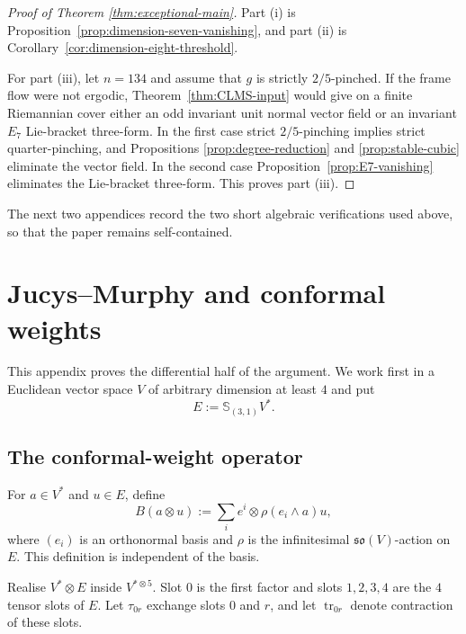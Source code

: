 \documentclass[reqno,11pt]{amsart}
\theoremstyle{definition}
\newcommand{\Hook}{\mathbb S_{(3,1)}}
\begin{document}
\begin{proof}[Proof of Theorem \ref{thm:exceptional-main}]
Part \textup{(i)} is Proposition~\ref{prop:dimension-seven-vanishing}, and
part \textup{(ii)} is Corollary~\ref{cor:dimension-eight-threshold}.

For part \textup{(iii)}, let $n=134$ and assume that $g$ is strictly
$2/5$-pinched.  If the frame flow were not ergodic,
Theorem~\ref{thm:CLMS-input} would give on a finite Riemannian cover either
an odd invariant unit normal vector field or an invariant $E_7$
Lie-bracket three-form.  In the first case strict $2/5$-pinching implies
strict quarter-pinching, and Propositions \ref{prop:degree-reduction} and
\ref{prop:stable-cubic} eliminate the vector field.  In the second case
Proposition~\ref{prop:E7-vanishing} eliminates the Lie-bracket three-form.
This proves part \textup{(iii)}.
\end{proof}



\appendix

The next two appendices record the two short algebraic verifications used above, so
that the paper remains self-contained.

\section{Jucys--Murphy and conformal weights}\label{sec:weitzenbock}\label{app:JM}

This appendix proves the differential half of the argument. We work first in a
Euclidean vector space $V$ of arbitrary dimension at least $4$ and put
$$
  E:=\Hook V^*.
$$



\subsection{The conformal-weight operator}

For $a\in V^*$ and $u\in E$, define
\begin{equation*}
  B(a\otimes u)
  :=\sum_i e^i\otimes\rho(e_i\wedge a)u,
\end{equation*}
where $(e_i)$ is an orthonormal basis and $\rho$ is the infinitesimal
$\mathfrak{so}(V)$-action on $E$. This definition is independent of the basis.

Realise $V^*\otimes E$ inside $V^{*\otimes5}$. Slot $0$ is the first factor and
slots $1,2,3,4$ are the $4$ tensor slots of $E$. Let $\tau_{0r}$ exchange slots
$0$ and $r$, and let $\operatorname{tr}_{0r}$ denote contraction of these
slots.
\end{document}
